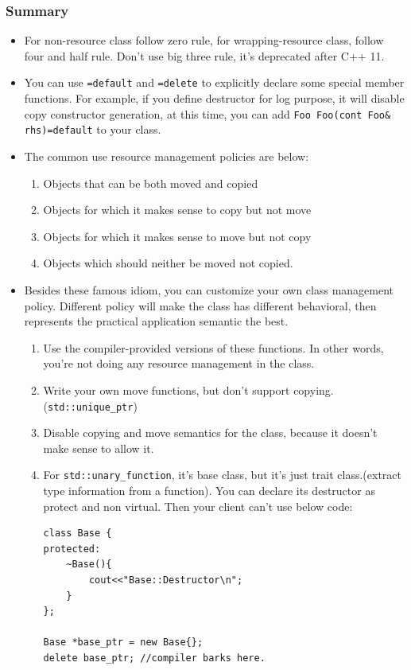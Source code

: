 \documentclass[a4paper,11pt,twoside]{book}
\begin{document}
\subsubsection{Summary}
\begin{itemize}
    \item For non-resource class follow zero rule, for wrapping-resource class, follow four and half rule. Don't use big three rule, it's deprecated after C++ 11.

    \item You can use \texttt{=default} and \texttt{=delete} to explicitly declare some special member functions. For example, if you define destructor for log purpose, it will disable copy constructor generation, at this time, you can add \texttt{Foo Foo(cont Foo\& rhs)=default} to your class.
        
    \item The common use resource management policies are below:

\begin{enumerate}
    \item Objects that can be both moved and copied
        \item Objects for which it makes sense to copy but not move
        \item Objects for which it makes sense to move but not copy
        \item Objects which should neither be moved not copied.
\end{enumerate}

	\item Besides these famous idiom, you can customize your own class management policy. Different policy will make the class has different behavioral, then represents the practical application semantic the best. 
	
	\begin{enumerate}
		\item Use the compiler-provided versions of these functions. In other words, you're not doing any resource management in the class.
		
		\item Write your own move functions, but don't support copying.(\texttt{std::unique\_ptr})
		
		\item Disable copying and move semantics for the class, because it doesn't make sense to allow it.
		
		\item For \texttt{std::unary\_function}, it's base class, but it's just trait class.(extract type information from a function). You can declare its destructor as protect and non virtual. Then your client can't use below code:
\begin{lstlisting}[numbers=none]
class Base {
protected:
	~Base(){
		cout<<"Base::Destructor\n";
	}
};

Base *base_ptr = new Base{};
delete base_ptr; //compiler barks here.
\end{lstlisting}
	\end{enumerate}

\end{itemize}
\end{document}

